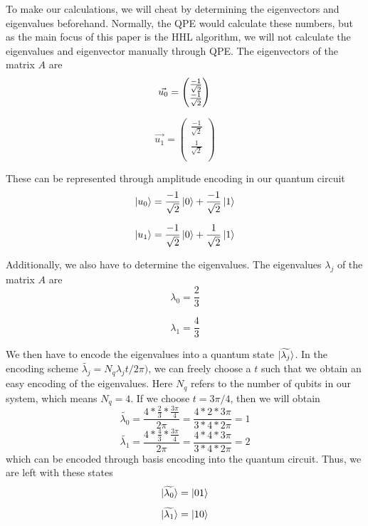 To make our calculations, we will cheat by determining the eigenvectors and eigenvalues beforehand.
Normally, the QPE would calculate these numbers, but as the main focus of this paper is the HHL algorithm, we will not calculate the eigenvalues and eigenvector manually through QPE.
The eigenvectors of the matrix $A$ are
\begin{equation}
\vec{u_0} = \begin{pmatrix} \frac{-1}{\sqrt{2}}\\ \frac{-1}{\sqrt{2}}\\ \end{pmatrix}\\
\end{equation}

\begin{equation}
\vec{u_1} = \begin{pmatrix} \frac{-1}{\sqrt{2}}\\ \frac{1}{\sqrt{2}}\\ \end{pmatrix}
\end{equation}

These can be represented through amplitude encoding in our quantum circuit
\begin{equation}
\ket{u_0} = \frac{-1}{\sqrt{2}}\ket{0} + \frac{-1}{\sqrt{2}}\ket{1}
\end{equation}

\begin{equation}
\ket{u_1}= \frac{-1}{\sqrt{2}}\ket{0} + \frac{1}{\sqrt{2}}\ket{1} 
\end{equation}

Additionally, we also have to determine the eigenvalues. The eigenvalues $\lambda_j$ of the matrix $A$ are
\begin{equation}
\lambda_0 = \frac{2}{3}
\end{equation}

\begin{equation}
\lambda_1 = \frac{4}{3}
\end{equation}

We then have to encode the eigenvalues into a quantum state $\ket{\widetilde{\lambda_j}}$.
In the encoding scheme $\widetilde{\lambda_j} = N_q\lambda_jt/2\pi)$, we can freely choose a $t$ such that we obtain an easy encoding of the eigenvalues. 
Here $N_q$ refers to the number of qubits in our system, which means $N_q = 4$.
If we choose $t = 3\pi/4$, then we will obtain
\begin{equation}
\widetilde{\lambda_0} =\frac{4*\frac{2}{3}*\frac{3\pi}{4}}{2 \pi} =\frac{4*2*3\pi}{3*4* 2 \pi} = 1
\end{equation}
\begin{equation}
\widetilde{\lambda_1} =\frac{4*\frac{4}{3}*\frac{3\pi}{4}}{2 \pi} =\frac{4*4*3\pi}{3*4* 2 \pi} = 2
\end{equation}
which can be encoded through basis encoding into the quantum circuit.
Thus, we are left with these states
\begin{equation}
\ket{\widetilde{\lambda_0}} = \ket{01}
\end{equation}
\begin{equation}
\ket{\widetilde{\lambda_1}} = \ket{10}
\end{equation}

